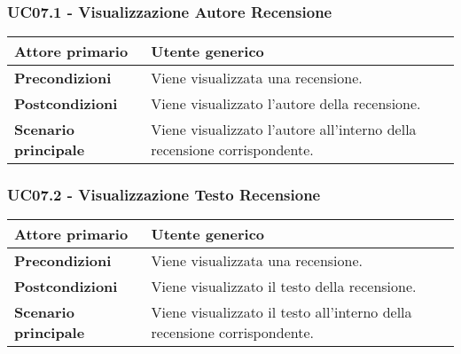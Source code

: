         \subsubsection{UC07.1 - Visualizzazione Autore Recensione}
        \label{UC07.1}

            \begin{center}
                \renewcommand{\arraystretch}{1.5}
                \begin{tabular}{m{10em} m{20em}}
                    \hline
                    \textbf{Attore primario} & Utente generico \\
                    \hline
                    \textbf{Precondizioni} & Viene visualizzata una recensione. \\
                    \hline
                    \textbf{Postcondizioni} & Viene visualizzato l'autore della recensione. \\
                    \hline
                    \textbf{Scenario principale} & Viene visualizzato l'autore all'interno della recensione corrispondente. \\
                    \hline
                \end{tabular}
            \end{center}

        \subsubsection{UC07.2 - Visualizzazione Testo Recensione}
        \label{UC07.2}

            \begin{center}
                \renewcommand{\arraystretch}{1.5}
                \begin{tabular}{m{10em} m{20em}}
                    \hline
                    \textbf{Attore primario} & Utente generico \\
                    \hline
                    \textbf{Precondizioni} & Viene visualizzata una recensione. \\
                    \hline
                    \textbf{Postcondizioni} & Viene visualizzato il testo della recensione. \\
                    \hline
                    \textbf{Scenario principale} & Viene visualizzato il testo all'interno della recensione corrispondente. \\
                    \hline
                \end{tabular}
            \end{center}

